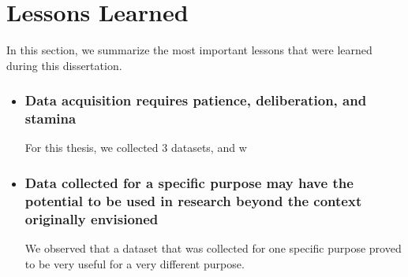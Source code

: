 \section{Lessons Learned}

In this section, we summarize the most important lessons that were learned during this dissertation.

\begin{itemize}

\item \subsubsection{Data acquisition requires patience, deliberation, and stamina}

For this thesis, we collected 3 datasets, and w


\item \subsubsection{Data collected for a specific purpose may have the potential to be used in research beyond the context originally envisioned}
 
 
We observed that a dataset that was collected for one specific purpose proved to be very useful for a very different purpose. 
\end{itemize}





